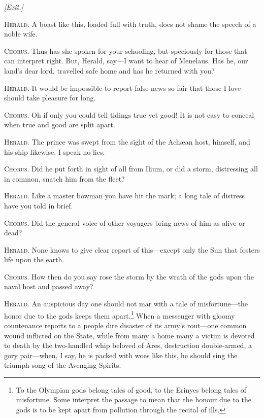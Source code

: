 \documentclass[12pt]{article}
\begin{document}
\begin{center}
\textit{[Exit.]}
\end{center}

\textsc{Herald.} A boast like this, loaded full with truth, does not shame the speech of a noble wife.

\textsc{Chorus.} Thus has she spoken for your schooling, but speciously for those that can interpret right. But, Herald, say---I want to hear of Menelaus. Has he, our land's dear lord, travelled safe home and has he returned with you?

\textsc{Herald.} It would be impossible to report false news so fair that those I love should take pleasure for long.

\textsc{Chorus.} Oh if only you could tell tidings true yet good! It is not easy to conceal when true and good are split apart.

\textsc{Herald.} The prince was swept from the sight of the Ach{\ae}an host, himself, and his ship likewise. I speak no lies.

\textsc{Chorus.} Did he put forth in sight of all from Ilium, or did a storm, distressing all in common, snatch him from the fleet?

\textsc{Herald.} Like a master bowman you have hit the mark; a long tale of distress have you told in brief.

\textsc{Chorus.} Did the general voice of other voyagers bring news of him as alive or dead?

\textsc{Herald.} None knows to give clear report of this---except only the Sun that fosters life upon the earth.

\textsc{Chorus.} How then do you say rose the storm by the wrath of the gods upon the naval host and passed away?

\textsc{Herald.} An auspicious day one should not mar with a tale of misfortune---the honor due to the gods keeps them apart.\footnote{To the Olympian gods belong tales of good, to the Erinyes belong tales of misfortune. Some interpret the passage to mean that the honour due to the gods is to be kept apart from pollution through the recital of ills.} When a messenger with gloomy countenance reports to a people dire disaster of its army's rout---one common wound inflicted on the State, while from many a home many a victim is devoted to death by the two-handled whip beloved of Ares, destruction double-armed, a gory pair---when, I say, he is packed with woes like this, he should sing the triumph-song of the Avenging Spirits.
\end{document}
